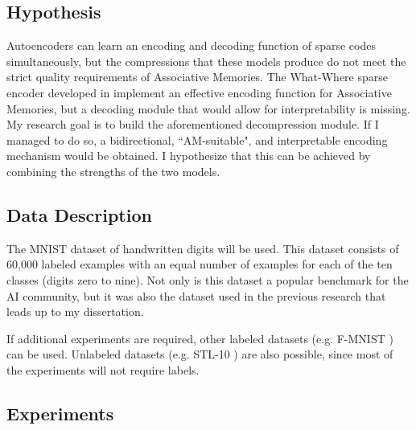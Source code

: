 \documentclass[runningheads]{llncs}
\begin{document}
\subsection{Hypothesis}
Autoencoders can learn an encoding and decoding function of sparse codes simultaneously, but the compressions that these models produce do not meet the strict quality requirements of Associative Memories.
The What-Where sparse encoder developed in \cite{sa2020storing} implement an effective encoding function for Associative Memories, but a decoding module that would allow for interpretability is missing. My research goal is to build the aforementioned decompression module. If I managed to do so, a bidirectional, ``AM-suitable", and interpretable encoding mechanism would be obtained. I hypothesize that this can be achieved by combining the strengths of the two models. 
\subsection{Data Description}
The MNIST dataset \cite{lecun1998mnist} of handwritten digits will be used. This dataset consists of 60,000 labeled examples with an equal number of examples for each of the ten classes (digits zero to nine). Not only is this dataset a popular benchmark for the AI community, but it was also the dataset used in the previous research that leads up to my dissertation.

If additional experiments are required, other labeled datasets (e.g. F-MNIST \cite{xiao2017fashion}) can be used. Unlabeled datasets (e.g. STL-10 \cite{coates2011analysis}) are also possible, since most of the experiments will not require labels.

\subsection{Experiments}
\label{sec:proposedSolution_exp}
\end{document}
